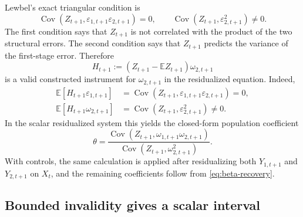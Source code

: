 \documentclass[11pt]{article}
\newcommand{\E}{\mathbb{E}}
\newcommand{\Cov}{\operatorname{Cov}}
\theoremstyle{plain}
\theoremstyle{definition}
\theoremstyle{remark}
\begin{document}
Lewbel's exact triangular condition is
\begin{equation}
\Cov(Z_{t+1},\varepsilon_{1,t+1}\varepsilon_{2,t+1})=0,
\qquad
\Cov(Z_{t+1},\varepsilon_{2,t+1}^2)\ne0.
\label{eq:lewbel-exact-assump}
\end{equation}
The first condition says that $Z_{t+1}$ is not correlated with the product of
the two structural errors. The second condition says that $Z_{t+1}$ predicts the
variance of the first-stage error. Therefore
\begin{equation}
H_{t+1}:=(Z_{t+1}-\E Z_{t+1})\omega_{2,t+1}
\label{eq:lewbel-instrument}
\end{equation}
is a valid constructed instrument for $\omega_{2,t+1}$ in the residualized equation.
Indeed,
\begin{align}
\E[H_{t+1}\varepsilon_{1,t+1}]&=
\Cov(Z_{t+1},\varepsilon_{1,t+1}\varepsilon_{2,t+1})=0,\label{eq:lewbel-valid}\\
\E[H_{t+1}\omega_{2,t+1}]&=\Cov(Z_{t+1},\varepsilon_{2,t+1}^2)\ne0.\label{eq:lewbel-relevance}
\end{align}
In the scalar residualized system this yields the closed-form population
coefficient
\begin{equation}
\theta=
\frac{\Cov(Z_{t+1},\omega_{1,t+1}\omega_{2,t+1})}
     {\Cov(Z_{t+1},\omega_{2,t+1}^{2})}.
\label{eq:lewbel-point}
\end{equation}
With controls, the same calculation is applied after residualizing both
$Y_{1,t+1}$ and $Y_{2,t+1}$ on $X_t$, and the remaining coefficients follow from
\eqref{eq:beta-recovery}.

\subsection{Bounded invalidity gives a scalar interval}
\end{document}
